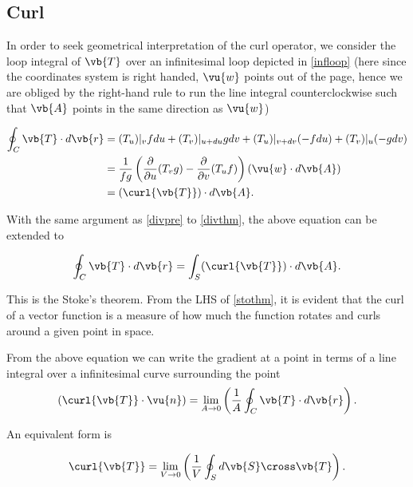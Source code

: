 \documentclass[english,a4paper,12pt]{report}
\begin{document}
\subsection{Curl}


In order to seek geometrical interpretation of the curl operator, we consider the loop integral of \(\vb{T}\) over an infinitesimal loop depicted in \cref{infloop} (here since the coordinates system is right handed, \(\vu{w}\) points out of the page, hence we are obliged by the right-hand rule to run the line integral counterclockwise such that \(\vb{A}\) points in the same direction as \(\vu{w}\))
	
\begin{equation} 
	\begin{aligned} 
		\oint_{C} \vb{T} \cdot d\vb{r} &= (T_u)|_{v}fdu + (T_v)|_{u+du}gdv + (T_u)|_{v+dv}(-fdu) + (T_v)|_{u}(-gdv) \\ &= \frac{1}{fg}\left(\frac{\partial }{\partial u} (T_{v} g) - \frac{\partial }{\partial v} (T_{u}f)\right)(\vu{w} \cdot d\vb{A}) \\ &= (\curl{\vb{T} } ) \cdot d\vb{A} . 
	\end{aligned} 
\end{equation}

With the same argument as \cref{divpre}  to \cref{divthm}, the above equation can be extended to
	
\begin{equation} 
	\oint_{C} \vb{T} \cdot d\vb{r} = \int_{S} (\curl{\vb{T}}) \cdot d\vb{A}. \label{stothm} 
\end{equation}
	
This is the Stoke's theorem. From the LHS of \cref{stothm}, it is evident that the curl of a vector function is a measure of how much the function rotates and curls around a given point in space.
	
From the above equation we can write the gradient at a point in terms of a line integral over a infinitesimal curve surrounding the point
\begin{equation}
	(\curl{\vb{T} } \cdot \vu{n} ) = \lim_{A \to 0} \left( \frac{1}{A} \oint_{C} \vb{T} \cdot d\vb{r}  \right). 
\end{equation}

An equivalent form is 

\begin{equation}
	\curl{\vb{T} } = \lim_{V \to 0} \left( \frac{1}{V} \oint_{S} d\vb{S} \cross \vb{T}  \right).
\end{equation}
\end{document}

